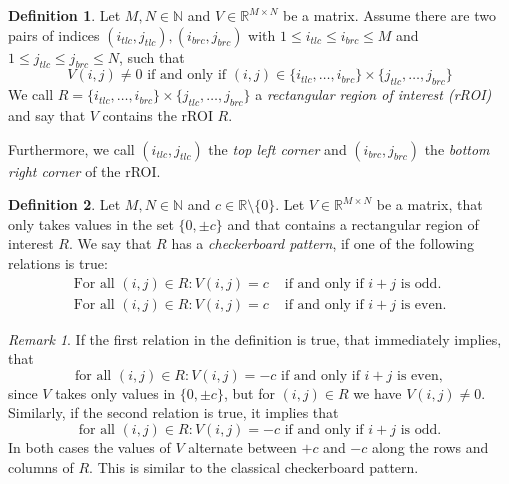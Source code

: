 \documentclass[a4paper,12pt]{article}
\theoremstyle{plain}
\theoremstyle{definition}
\newtheorem{definition}{Definition}
\theoremstyle{remark}
\newtheorem{remark}{Remark}
\begin{document}
\newpage

\begin{definition}
	Let $M, N \in \mathbb{N}$ and $V \in \mathbb{R}^{M \times N}$ be a matrix. Assume there are two pairs of indices $(i_{tlc}, j_{tlc}), (i_{brc}, j_{brc})$ with $1 \leq i_{tlc} \leq i_{brc} \leq M$ and $1 \leq j_{tlc} \leq j_{brc} \leq N$, such that
	\begin{equation}
		V(i, j) \neq 0 \textrm{ if and only if } (i, j) \in \{ i_{tlc}, \dots, i_{brc} \} \times \{ j_{tlc}, \dots, j_{brc} \}
	\end{equation}
	We call $R = \{ i_{tlc}, \dots, i_{brc} \} \times \{ j_{tlc}, \dots, j_{brc} \}$ a \emph{rectangular region of interest (rROI)} and say that $V$ contains the rROI $R$.
	
	Furthermore, we call $(i_{tlc}, j_{tlc})$ the \emph{top left corner} and $(i_{brc}, j_{brc})$ the \emph{bottom right corner} of the rROI.
\end{definition}

\begin{definition}
	Let $M, N \in \mathbb{N}$ and $c \in \mathbb{R} \setminus \{ 0 \}$. Let $V \in \mathbb{R}^{M \times N}$ be a matrix, that only takes values in the set $\{ 0, \pm c \}$ and that contains a rectangular region of interest $R$. We say that $R$ has a \emph{checkerboard pattern}, if one of the following relations is true:
	\begin{subequations}
		\begin{align}
			\textrm{For all } (i, j) \in R: V(i, j) = c &\textrm{ if and only if } i + j \textrm{ is odd}.\\
			\textrm{For all } (i, j) \in R: V(i, j) = c &\textrm{ if and only if } i + j \textrm{ is even}.
		\end{align}
	\end{subequations}
\end{definition}

\begin{remark}
	If the first relation in the definition is true, that immediately implies, that
	\begin{equation*}
		\textrm{for all } (i, j) \in R: V(i, j) = - c \textrm{ if and only if } i + j \textrm{ is even},
	\end{equation*}
	since $V$ takes only values in $\{ 0, \pm c \}$, but for $(i, j) \in R$ we have $V(i,j) \neq 0$.
	Similarly, if the second relation is true, it implies that
	\begin{equation*}
		\textrm{for all } (i, j) \in R: V(i, j) = - c \textrm{ if and only if } i + j \textrm{ is odd}.
	\end{equation*}
	In both cases the values of $V$ alternate between $+c$ and $-c$ along the rows and columns of $R$. This is similar to the classical checkerboard pattern.
\end{remark}
\end{document}
